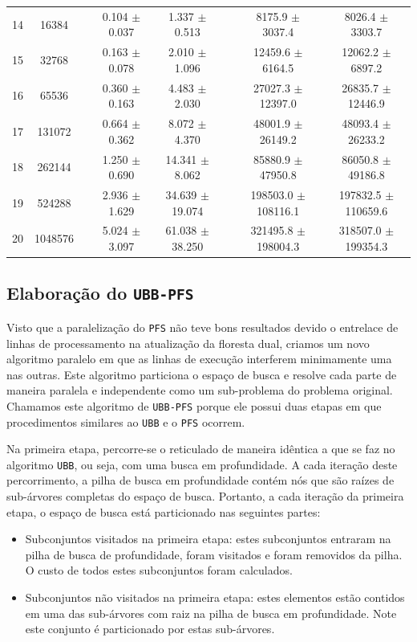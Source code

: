 \documentclass[12pt]{article}
\newcommand{\algname}[1]{\texttt{#1}}
\begin{document}
\begin{table}
\begin{tabular}{cc c cc c cc}
14 &   16384 && 0.104 $\pm$ 0.037 & 1.337 $\pm$ 0.513 && 8175.9 $\pm$ 3037.4 & 8026.4 $\pm$ 3303.7 \\
15 &   32768 && 0.163 $\pm$ 0.078 & 2.010 $\pm$ 1.096 && 12459.6 $\pm$ 6164.5 & 12062.2 $\pm$ 6897.2 \\
16 &   65536 && 0.360 $\pm$ 0.163 & 4.483 $\pm$ 2.030 && 27027.3 $\pm$ 12397.0 & 26835.7 $\pm$ 12446.9 \\
17 &  131072 && 0.664 $\pm$ 0.362 & 8.072 $\pm$ 4.370 && 48001.9 $\pm$ 26149.2 & 48093.4 $\pm$ 26233.2 \\
18 &  262144 && 1.250 $\pm$ 0.690 & 14.341 $\pm$ 8.062 && 85880.9 $\pm$ 47950.8 & 86050.8 $\pm$ 49186.8 \\
19 &  524288 && 2.936 $\pm$ 1.629 & 34.639 $\pm$ 19.074 && 198503.0 $\pm$ 108116.1 & 197832.5 $\pm$ 110659.6 \\
20 & 1048576 && 5.024 $\pm$ 3.097 & 61.038 $\pm$ 38.250 && 321495.8 $\pm$ 198004.3 & 318507.0 $\pm$ 199354.3 \\
\bottomrule
\end{tabular}
\end{table}


\subsection{Elaboração do \algname{UBB-PFS}}
\label{sec:ubb_pfs}
Visto que a paralelização do \algname{PFS} não teve bons resultados 
devido o entrelace de linhas de processamento na atualização da floresta 
dual, criamos um novo algoritmo paralelo em que as linhas de execução
interferem minimamente uma nas outras. Este algoritmo particiona o 
espaço de busca e resolve cada parte de maneira paralela e independente
como um sub-problema do problema original. Chamamos este algoritmo de 
\algname{UBB-PFS} porque ele possui duas etapas em que procedimentos 
similares ao \algname{UBB} e o \algname{PFS} ocorrem. 

Na primeira etapa, percorre-se o reticulado de maneira idêntica a que 
se faz no algoritmo \algname{UBB}, ou seja, com uma busca em
profundidade. A cada iteração deste percorrimento, a pilha de busca em 
profundidade contém nós que são raízes de sub-árvores completas do
espaço de busca. Portanto, a cada iteração da primeira etapa, o espaço
de busca está particionado nas seguintes partes:
\begin{itemize}
    \item{Subconjuntos visitados na primeira etapa: estes subconjuntos
        entraram na pilha de busca de profundidade, foram visitados e 
        foram removidos da pilha. O custo de todos estes subconjuntos 
        foram calculados.}
    \item{Subconjuntos não visitados na primeira etapa: estes elementos
        estão contidos em uma das sub-árvores com raiz na pilha de
        busca em profundidade. Note este conjunto é particionado por
        estas sub-árvores.}
\end{itemize}
\end{document}
